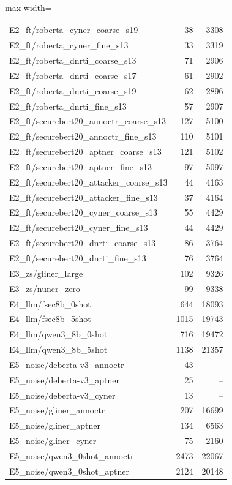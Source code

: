 \begin{table}[t]
\begin{adjustbox}{max width=\textwidth}
\begin{tabular}{lrr}
E2\_ft/roberta\_cyner\_coarse\_s19 & 38 & 3308 \\
E2\_ft/roberta\_cyner\_fine\_s13 & 33 & 3319 \\
E2\_ft/roberta\_dnrti\_coarse\_s13 & 71 & 2906 \\
E2\_ft/roberta\_dnrti\_coarse\_s17 & 61 & 2902 \\
E2\_ft/roberta\_dnrti\_coarse\_s19 & 62 & 2896 \\
E2\_ft/roberta\_dnrti\_fine\_s13 & 57 & 2907 \\
E2\_ft/securebert20\_annoctr\_coarse\_s13 & 127 & 5100 \\
E2\_ft/securebert20\_annoctr\_fine\_s13 & 110 & 5101 \\
E2\_ft/securebert20\_aptner\_coarse\_s13 & 121 & 5102 \\
E2\_ft/securebert20\_aptner\_fine\_s13 & 97 & 5097 \\
E2\_ft/securebert20\_attacker\_coarse\_s13 & 44 & 4163 \\
E2\_ft/securebert20\_attacker\_fine\_s13 & 37 & 4164 \\
E2\_ft/securebert20\_cyner\_coarse\_s13 & 55 & 4429 \\
E2\_ft/securebert20\_cyner\_fine\_s13 & 44 & 4429 \\
E2\_ft/securebert20\_dnrti\_coarse\_s13 & 86 & 3764 \\
E2\_ft/securebert20\_dnrti\_fine\_s13 & 76 & 3764 \\
E3\_zs/gliner\_large & 102 & 9326 \\
E3\_zs/nuner\_zero & 99 & 9338 \\
E4\_llm/fsec8b\_0shot & 644 & 18093 \\
E4\_llm/fsec8b\_5shot & 1015 & 19743 \\
E4\_llm/qwen3\_8b\_0shot & 716 & 19472 \\
E4\_llm/qwen3\_8b\_5shot & 1138 & 21357 \\
E5\_noise/deberta-v3\_annoctr & 43 & -- \\
E5\_noise/deberta-v3\_aptner & 25 & -- \\
E5\_noise/deberta-v3\_cyner & 13 & -- \\
E5\_noise/gliner\_annoctr & 207 & 16699 \\
E5\_noise/gliner\_aptner & 134 & 6563 \\
E5\_noise/gliner\_cyner & 75 & 2160 \\
E5\_noise/qwen3\_0shot\_annoctr & 2473 & 22067 \\
E5\_noise/qwen3\_0shot\_aptner & 2124 & 20148 \\

\end{tabular}
\end{adjustbox}
\end{table}
